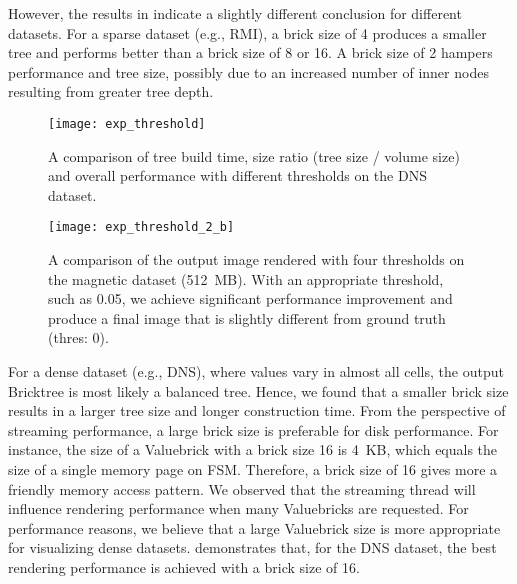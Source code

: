 However, the results in  indicate a slightly
different conclusion for different datasets. For a sparse dataset (e.g., RMI),
a brick size of 4 produces a smaller tree and performs better than a brick size of 8 or 16.
A brick size of 2 hampers performance and tree size, possibly due to an increased number of
inner nodes resulting from greater tree depth. 

\begin{figure}[b]
    \centering
    \texttt{[image: exp\_threshold]}
    \vspace{-2em}
	\caption{\label{fig:exp_threshold}%
	A comparison of tree build time, size ratio (tree size / volume size) and overall performance with different thresholds on the DNS dataset.}
	\vspace{-1em}
\end{figure}

\begin{figure*}[t]
    \centering
    \texttt{[image: exp\_threshold\_2\_b]}
	\caption{\label{fig:exp_threshold_2}%
	A comparison of the output image rendered with four thresholds on the magnetic dataset (512~MB).
	With an appropriate threshold, such as 0.05, we achieve significant performance improvement and produce a final image that is slightly different from ground truth (thres: 0).
	}
	\vspace{-1em}
\end{figure*}


For a dense dataset (e.g., DNS), where values vary in almost all cells,
the output Bricktree is most likely a balanced tree. Hence, we found that
a smaller brick size results in a larger tree size and longer construction time.
From the perspective of streaming performance, a large brick size is preferable 
for disk performance. For instance, the size of a Valuebrick with a
brick size 16 is 4~KB, which equals the size of a single memory page on FSM. 
Therefore, a brick size of 16 gives more a friendly memory access pattern. 
We observed that the streaming thread will influence rendering performance
when many Valuebricks are requested. For performance reasons, we believe that a 
large Valuebrick size is more appropriate for visualizing dense datasets. 
 demonstrates that, for the DNS dataset, the best rendering 
performance is achieved with a brick size of 16.




